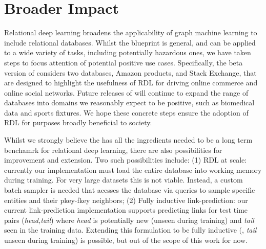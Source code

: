 \section{Broader Impact}\label{app: broader impact}

Relational deep learning broadens the applicability of graph machine learning to include relational databases. Whilst the blueprint is general, and can be applied to a wide variety of tasks, including potentially hazardous ones, we have taken steps to focus attention of potential positive use cases. Specifically, the beta version of \relbench considers two databases, Amazon products, and Stack Exchange, that are designed to highlight the usefulness of RDL for driving online commerce and online social networks. Future releases of \relbench will continue to expand the range of databases into domains we reasonably expect to be positive, such as biomedical data and sports fixtures. We hope these concrete steps ensure the adoption of RDL for purposes broadly beneficial to society.

Whilst we strongly believe the \relbench has all the ingredients needed to be a long term benchamrk for relational deep learning, there are also possibilities for improvement and extension. Two such possibilities include: (1) RDL at scale: currently our implementation must load the entire database into working memory during training. For very large datasets this is not viable. Instead, a custom batch sampler is needed that acesses the database via queries to sample specific entities and their pkey-fkey neighbors; (2) Fully inductive link-prediction: our current link-prediction implementation supports predicting links for test time pairs (\emph{head,tail}) where \emph{head} is potentially new (unseen during training) and \emph{tail} seen in the training data. Extending this formulation to be fully inductive (\ie, \emph{tail} unseen during training) is possible, but out of the scope of this work for now. 